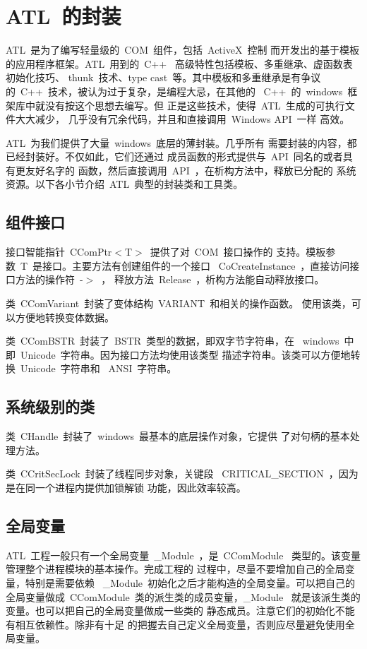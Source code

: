 \section{ATL~的封装}

ATL~是为了编写轻量级的~COM~组件，包括~ActiveX~控制
而开发出的基于模板的应用程序框架。ATL~用到的~C++~
高级特性包括模板、多重继承、虚函数表初始化技巧、
thunk~技术、type cast~等。其中模板和多重继承是有争议
的~C++~技术，被认为过于复杂，是编程大忌，在其他的
~C++~的~windows~框架库中就没有按这个思想去编写。但
正是这些技术，使得~ATL~生成的可执行文件大大减少，
几乎没有冗余代码，并且和直接调用~Windows API~一样
高效。

ATL~为我们提供了大量~windows~底层的薄封装。几乎所有
需要封装的内容，都已经封装好。不仅如此，它们还通过
成员函数的形式提供与~API~同名的或者具有更友好名字的
函数，然后直接调用~API~，在析构方法中，释放已分配的
系统资源。以下各小节介绍~ATL~典型的封装类和工具类。

\subsection{组件接口}

接口智能指针~CComPtr$<$T$>$~提供了对~COM~接口操作的
支持。模板参数~T~是接口。主要方法有创建组件的一个接口
~CoCreateInstance~，直接访问接口方法的操作符~-$>$~，
释放方法~Release~，析构方法能自动释放接口。

类~CComVariant~封装了变体结构~VARIANT~和相关的操作函数。
使用该类，可以方便地转换变体数据。

类~CComBSTR~封装了~BSTR~类型的数据，即双字节字符串，在
~windows~中即~Unicode~字符串。因为接口方法均使用该类型
描述字符串。该类可以方便地转换~Unicode~字符串和
~ANSI~字符串。

\subsection{系统级别的类}

类~CHandle~封装了~windows~最基本的底层操作对象，它提供
了对句柄的基本处理方法。

类~CCritSecLock~封装了线程同步对象，关键段
~CRITICAL\_SECTION~，因为是在同一个进程内提供加锁解锁
功能，因此效率较高。

\subsection{全局变量}

ATL~工程一般只有一个全局变量~\_Module~，是~CComModule~
类型的。该变量管理整个进程模块的基本操作。完成工程的
过程中，尽量不要增加自己的全局变量，特别是需要依赖
~\_Module~初始化之后才能构造的全局变量。可以把自己的
全局变量做成~CComModule~类的派生类的成员变量，\_Module~
就是该派生类的变量。也可以把自己的全局变量做成一些类的
静态成员。注意它们的初始化不能有相互依赖性。除非有十足
的把握去自己定义全局变量，否则应尽量避免使用全局变量。

